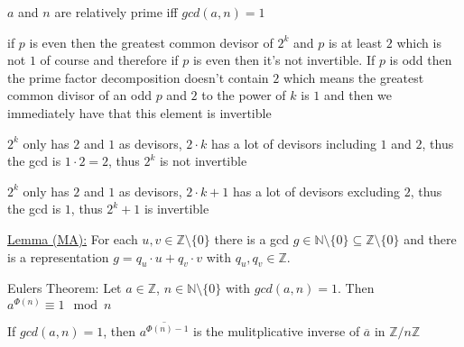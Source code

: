 \documentclass[landscape, a4paper]{article}
\begin{document}
\begin{minipage}[t]{0.198\pagewidth}
\begin{betterlist}
\begin{betterlist}
			\item $a$ and $n$ are \alert{relatively prime} \alert{iff} $gcd(a, n) = 1$
			\item if $p$ is even then the greatest common devisor of $2^k$ and $p$ is at least $2$ which is not $1$ of course and therefore if $p$ is even then it's not invertible. If $p$ is odd then the prime factor decomposition doesn't contain $2$ which means the greatest common divisor of an odd $p$ and $2$ to the power of $k$ is $1$ and then we immediately have that this element is invertible %
			\begin{betterlist}
				\item $2^k$ only has $2$ and $1$ as devisors, $2\cdot k$ has a lot of devisors including $1$ and $2$, thus the gcd is $1\cdot 2 = 2$, thus $2^k$ is not invertible
				\item $2^k$ only has $2$ and $1$ as devisors, $2\cdot k+1$ has a lot of devisors excluding $2$, thus the gcd is $1$, thus $2^k+1$ is invertible
			\end{betterlist}
			\item \underline{Lemma (MA):} For each $u, v \in \mathbb{Z} \setminus \{0\}$ there is a gcd $g \in \mathbb{N} \setminus \{0\} \subseteq \mathbb{Z} \setminus \{0\}$ and there is a representation $g = q_u \cdot u + q_v \cdot v$ with $q_u, q_v \in \mathbb{Z}$.
		\end{betterlist}
		\item \alert{Eulers Theorem:} Let $a\in \mathbb{Z}$, $n\in \mathbb{N}\setminus \{0\}$ with $gcd(a, n) = 1$. Then $a^{\Phi(n)}\equiv 1 \mod n$
		\begin{betterlist}
			\item If $gcd(a, n) = 1$, then $\overline{a^{\Phi(n)-1}}$ is the \alert{mulitplicative inverse} of $\overline{a}$ in $\mathbb{Z}/n\mathbb{Z}$

\end{betterlist}
\end{betterlist}
\end{minipage}
\end{document}
